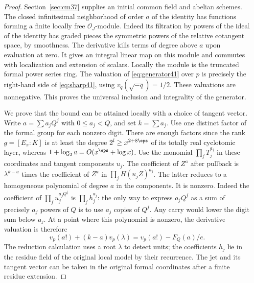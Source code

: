 \documentclass[a4paper,11pt]{article}
\theoremstyle{definition}
\theoremstyle{remark}
\numberwithin{equation}{section}
\newcommand{\OO}{\mathcal O}
\begin{document}
\begin{proof}
Section~\ref{sec:cm37} supplies an initial common field and abelian schemes. The closed infinitesimal neighborhood of order \(a\) of the identity has functions forming a finite locally free \(\OO_J\)-module. Indeed its filtration by powers of the ideal of the identity has graded pieces the symmetric powers of the relative cotangent space, by smoothness. The derivative kills terms of degree above \(a\) upon evaluation at zero. It gives an integral linear map on this module and commutes with localization and extension of scalars. Locally the module is the truncated formal power series ring. The valuation of \eqref{eq:generator41} over \(p\) is precisely the right-hand side of \eqref{eq:sharp41}, using \(v_q(\sqrt{-q})=1/2\). These valuations are nonnegative. This proves the universal inclusion and integrality of the generator.

We prove that the bound can be attained locally with a choice of tangent vector. Write \(a=\sum a_jQ^j\) with \(0\le a_j<Q\), and set \(k=\sum a_j\). Use one distinct factor of the formal group for each nonzero digit. There are enough factors since the rank \(g=[E_x:K]\) is at least the degree \(2^l\ge x^{2+8\eps}\) of its totally real cyclotomic layer, whereas \(1+\log_2 a=O(x^\eps+\log x)\). Use the monomial \(\prod_j T_j^{a_j}\) in these coordinates and tangent components \(u_j\). The coefficient of \(Z^a\) after pullback is \(\lambda^{k-a}\) times the coefficient of \(Z^a\) in \(\prod_j H(u_jZ)^{a_j}\). The latter reduces to a homogeneous polynomial of degree \(a\) in the components. It is nonzero. Indeed the coefficient of \(\prod_j u_j^{a_j Q^j}\) is \(\prod_j h_j^{a_j}\): the only way to express \(a_jQ^j\) as a sum of precisely \(a_j\) powers of \(Q\) is to use \(a_j\) copies of \(Q^j\). Any carry would lower the digit sum below \(a_j\). At a point where this polynomial is nonzero, the derivative valuation is therefore
\[
          v_p(a!)+(k-a)v_p(\lambda)
                      =v_p(a!)-F_Q(a)/e .
\]
The reduction calculation uses a root \(\lambda\) to detect units; the coefficients \(h_j\) lie in the residue field of the original local model by their recurrence. The jet and its tangent vector can be taken in the original formal coordinates after a finite residue extension.


\end{proof}
\end{document}
